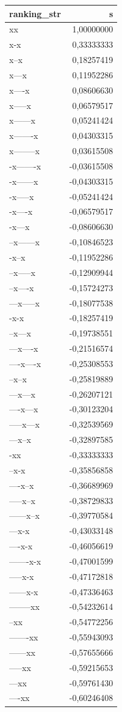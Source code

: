 \documentclass[
  letterpaper,
  DIV=11,
  numbers=noendperiod]{scrreprt}
\begin{document}
\begin{longtable*}{lr}
\toprule
ranking\_str & s \\ 
\midrule\addlinespace[2.5pt]
xx & 1,00000000 \\ 
x-x & 0,33333333 \\ 
x--x & 0,18257419 \\ 
x---x & 0,11952286 \\ 
x----x & 0,08606630 \\ 
x-----x & 0,06579517 \\ 
x------x & 0,05241424 \\ 
x-------x & 0,04303315 \\ 
x--------x & 0,03615508 \\ 
-x-------x & -0,03615508 \\ 
-x------x & -0,04303315 \\ 
-x-----x & -0,05241424 \\ 
-x----x & -0,06579517 \\ 
-x---x & -0,08606630 \\ 
--x------x & -0,10846523 \\ 
-x--x & -0,11952286 \\ 
--x-----x & -0,12909944 \\ 
--x----x & -0,15724273 \\ 
---x-----x & -0,18077538 \\ 
-x-x & -0,18257419 \\ 
--x---x & -0,19738551 \\ 
---x----x & -0,21516574 \\ 
----x----x & -0,25308553 \\ 
--x--x & -0,25819889 \\ 
---x---x & -0,26207121 \\ 
----x---x & -0,30123204 \\ 
-----x---x & -0,32539569 \\ 
---x--x & -0,32897585 \\ 
-xx & -0,33333333 \\ 
--x-x & -0,35856858 \\ 
----x--x & -0,36689969 \\ 
-----x--x & -0,38729833 \\ 
------x--x & -0,39770584 \\ 
---x-x & -0,43033148 \\ 
----x-x & -0,46056619 \\ 
-------x-x & -0,47001599 \\ 
-----x-x & -0,47172818 \\ 
------x-x & -0,47336463 \\ 
--------xx & -0,54232614 \\ 
--xx & -0,54772256 \\ 
-------xx & -0,55943093 \\ 
------xx & -0,57655666 \\ 
-----xx & -0,59215653 \\ 
---xx & -0,59761430 \\ 
----xx & -0,60246408 \\ 
\bottomrule
\end{longtable*}
\end{document}
